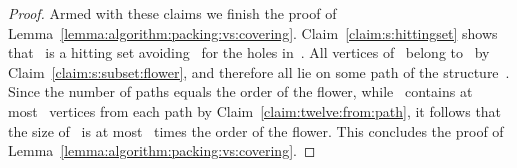 \begin{proof}
Armed with these claims we finish the proof of Lemma~\ref{lemma:algorithm:packing:vs:covering}. Claim~\ref{claim:s:hittingset} shows that~ is a hitting set avoiding~ for the holes in~. All vertices of~ belong to~ by Claim~\ref{claim:s:subset:flower}, and therefore all lie on some path of the structure~. Since the number of paths equals the order of the flower, while~ contains at most~ vertices from each path by Claim~\ref{claim:twelve:from:path}, it follows that the size of~ is at most~ times the order of the flower. This concludes the proof of Lemma~\ref{lemma:algorithm:packing:vs:covering}.
\end{proof}

